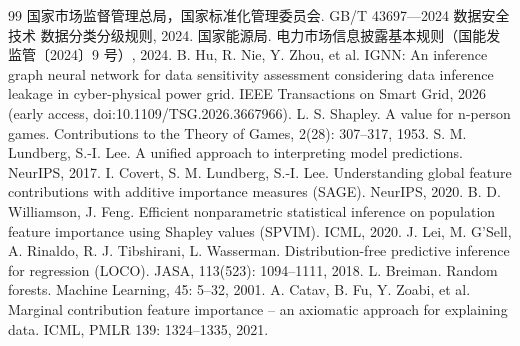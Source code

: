 \documentclass[zihao=-4,a4paper]{ctexart}
\begin{document}
\begin{thebibliography}{99}
\small
{} 国家市场监督管理总局，国家标准化管理委员会. GB/T 43697—2024 数据安全技术 数据分类分级规则, 2024.
 国家能源局. 电力市场信息披露基本规则（国能发监管〔2024〕9 号）, 2024.
 B. Hu, R. Nie, Y. Zhou, et al. IGNN: An inference graph neural network for data sensitivity assessment considering data inference leakage in cyber-physical power grid. IEEE Transactions on Smart Grid, 2026 (early access, doi:10.1109/TSG.2026.3667966).
 L. S. Shapley. A value for n-person games. Contributions to the Theory of Games, 2(28): 307--317, 1953.
 S. M. Lundberg, S.-I. Lee. A unified approach to interpreting model predictions. NeurIPS, 2017.
 I. Covert, S. M. Lundberg, S.-I. Lee. Understanding global feature contributions with additive importance measures (SAGE). NeurIPS, 2020.
 B. D. Williamson, J. Feng. Efficient nonparametric statistical inference on population feature importance using Shapley values (SPVIM). ICML, 2020.
 J. Lei, M. G'Sell, A. Rinaldo, R. J. Tibshirani, L. Wasserman. Distribution-free predictive inference for regression (LOCO). JASA, 113(523): 1094--1111, 2018.
 L. Breiman. Random forests. Machine Learning, 45: 5--32, 2001.
 A. Catav, B. Fu, Y. Zoabi, et al. Marginal contribution feature importance -- an axiomatic approach for explaining data. ICML, PMLR 139: 1324--1335, 2021.
\end{thebibliography}
\end{document}
